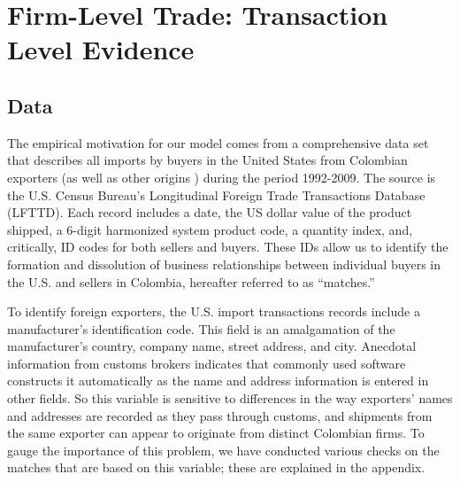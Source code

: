 \documentclass[12pt,titlepage]{article}
\begin{document}
\section{Firm-Level Trade: Transaction Level Evidence}
\label{sec:data}

\subsection{Data}

The empirical motivation for our model comes from a comprehensive data set
that describes all imports by buyers in the United States from Colombian
exporters (as well as other origins ) during the period 1992-2009. The
source is the U.S. Census Bureau's Longitudinal Foreign Trade Transactions
Database (LFTTD). Each record includes a date, the US dollar value of the
product shipped, a 6-digit harmonized system product code, a quantity index,
and, critically, ID codes for both sellers and buyers. These IDs allow us to
identify the formation and dissolution of business relationships between
individual buyers in the U.S. and sellers in Colombia, hereafter referred to
as \textquotedblleft matches.\textquotedblright \footnotemark{}\ 

To identify foreign exporters, the U.S. import transactions records include
a manufacturer's identification code.\footnotemark{} This field is an
amalgamation of the manufacturer's country, company name, street address,
and city. Anecdotal information from customs brokers indicates that commonly
used software constructs it automatically as the name and address
information is entered in other fields. So this variable is sensitive to
differences in the way exporters' names and addresses are recorded as they
pass through customs, and shipments from the same exporter can appear to
originate from distinct Colombian firms. To gauge the importance of this
problem, we have conducted various checks on the matches that are based on
this variable; these are explained in the appendix.
\end{document}
